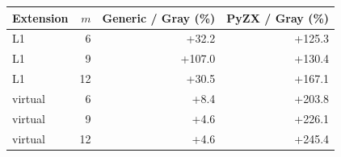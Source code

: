 \begin{tabular}{lrrr}
\toprule
Extension & $m$ & Generic / Gray (\%) & PyZX / Gray (\%)\\
\midrule
L1 & 6 & +32.2 & +125.3\\
L1 & 9 & +107.0 & +130.4\\
L1 & 12 & +30.5 & +167.1\\
virtual & 6 & +8.4 & +203.8\\
virtual & 9 & +4.6 & +226.1\\
virtual & 12 & +4.6 & +245.4\\
\bottomrule
\end{tabular}
